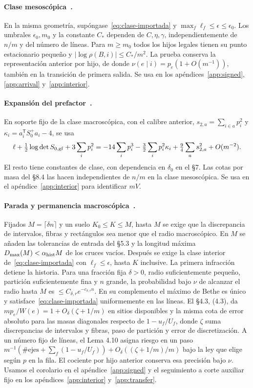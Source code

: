 \paragraph{Clase mesoscópica~\cite[\S8.1 y teo.~8.1]{pc}.}
En la misma geometría, supóngase~\eqref{eq:clase-importada} y
\(\max_f\ell_f\le\epsilon\le\epsilon_0\). Los umbrales \(\epsilon_0,m_0\) y la constante
\(C_*\) dependen de \(C,\eta,\gamma\), independientemente de \(n/m\) y del número de líneas.
Para \(m\ge m_0\) todos los hijos legales tienen su punto estacionario pequeño y
\(|\log\rho(B,i)|\le C_*/m^2\). La prueba conserva la representación anterior por hijo,
de donde \(\nu(e\mid i)=p_e(1+O(m^{-1}))\), también en la transición de primera salida.
Se usa en los apéndices~\ref{app:signed}, \ref{app:arrival} y~\ref{app:interior}.

\paragraph{Expansión del prefactor~\cite[\S\S7.5--7.8 y 8.4]{pc}.}
En soporte fijo de la clase macroscópica, con el calibre anterior,
\(s_{2,a}=\sum_{i\in a}p_i^2\) y \(\kappa_i=a_i^{\mathsf T}S_0^+a_i-4\), se usa
\[
 \ell+\tfrac12\log\det S_{0,\rm gf}+3\sum_i p_i^2
   =-14\sum_i p_i^3-\tfrac32\sum_i p_i^2\kappa_i
       +\tfrac94\sum_a s_{2,a}^2+O(m^{-2}).
\]
El resto tiene constantes de clase, con dependencia en \(\delta_0\) en el §7.
Las cotas por masa del §8.4 las hacen independientes de \(n/m\) en la clase mesoscópica.
Se usa en el apéndice~\ref{app:interior} para identificar \(mV\).

\paragraph{Parada y permanencia macroscópica~\cite[def.~2.2, \S4 y cor.~4.12]{tc}.}
Fijados \(M=\lceil\delta n\rceil\) y un suelo \(K_0\le K\le M\), hasta \(M\) se exige
que la discrepancia de intervalos, fibras y rectángulos sea menor que el radio macroscópico.
En \(M\) se añaden las tolerancias de entrada del §5.3 y la longitud máxima
\(D_{\max}(M)<\alpha_{\rm hist}M\) de los cruces vacíos. Después se exige la clase
interior de~\eqref{eq:clase-importada} con \(\ell_f\le\epsilon\), hasta \(K\) inclusive.
La primera infracción detiene la historia. Para una fracción fija \(\delta>0\), radio
suficientemente pequeño, partición suficientemente fina y \(n\) grande, la probabilidad
bajo \(\nu\) de alcanzar el radio hasta \(M\) es \(\le C_{\delta,r}e^{-c_{\delta,r}n}\).
En su complemento el máximo de Bethe es único y satisface~\eqref{eq:clase-importada}
uniformemente en las líneas. El §4.3, (4.3), da
\(mp_e/W(e)=1+O_\delta(\zeta+1/m)\) en sitios disponibles y la misma cota de error
absoluto para las masas diagonales respecto de \(1-u_f/U_f\), donde \(\zeta\) suma
discrepancias de intervalos y fibras, paso de partición y error de discretización.
A un número fijo de líneas, el Lema 4.10 asigna riesgo en un paso
\(m^{-1}(\#\text{ejes}+\sum_f(1-u_f/U_f))+O_\delta((\zeta+1/m)/m)\) bajo la ley que
elige según \(p\) en la fila. El cociente por hijo anterior conserva esa precisión bajo \(\nu\).
Usamos el corolario en el apéndice~\ref{app:signed} y el seguimiento a corte auxiliar
fijo en los apéndices~\ref{app:interior} y~\ref{app:transfer}.

